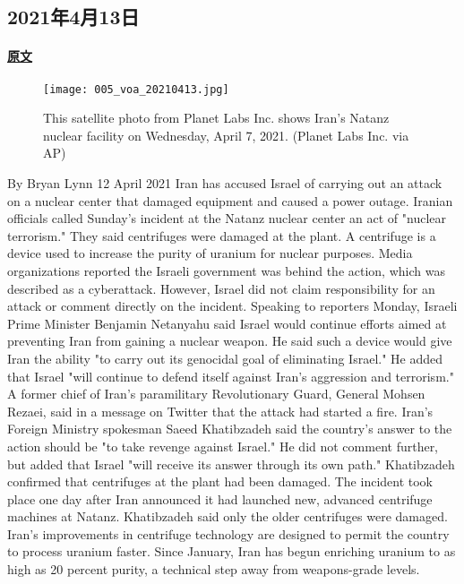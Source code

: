 \subsection{2021年4月13日}
\paragraph{\href{https://www.51voa.com/VOA_Special_English/iran-blames-israel-for-nuclear-plant-outage-86655.html}{原文}}

\begin{figure}[H]
\centering
\texttt{[image: 005\_voa\_20210413.jpg]}
\caption{This satellite photo from Planet Labs Inc. shows Iran's Natanz nuclear facility on Wednesday, April 7, 2021. (Planet Labs Inc. via AP)}
\end{figure}
By Bryan Lynn
12 April 2021
Iran has accused Israel of carrying out an attack on a nuclear center that damaged equipment and caused a power outage.
Iranian officials called Sunday's incident at the Natanz nuclear center an act of "nuclear terrorism." They said centrifuges were damaged at the plant. A centrifuge is a device used to increase the purity of uranium for nuclear purposes.
Media organizations reported the Israeli government was behind the action, which was described as a cyberattack. However, Israel did not claim responsibility for an attack or comment directly on the incident.
Speaking to reporters Monday, Israeli Prime Minister Benjamin Netanyahu said Israel would continue efforts aimed at preventing Iran from gaining a nuclear weapon. He said such a device would give Iran the ability "to carry out its genocidal goal of eliminating Israel." He added that Israel "will continue to defend itself against Iran's aggression and terrorism."
A former chief of Iran's paramilitary Revolutionary Guard, General Mohsen Rezaei, said in a message on Twitter that the attack had started a fire.
Iran's Foreign Ministry spokesman Saeed Khatibzadeh said the country's answer to the action should be "to take revenge against Israel." He did not comment further, but added that Israel "will receive its answer through its own path."
Khatibzadeh confirmed that centrifuges at the plant had been damaged. The incident took place one day after Iran announced it had launched new, advanced centrifuge machines at Natanz. Khatibzadeh said only the older centrifuges were damaged.
Iran's improvements in centrifuge technology are designed to permit the country to process uranium faster.
Since January, Iran has begun enriching uranium to as high as 20 percent purity, a technical step away from weapons-grade levels.
